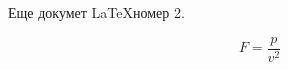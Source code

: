 \documentclass{article}
\begin{document}
Еще докумет \LaTeX номер 2.

$$ F=\frac{p} {v^2} $$
\end{document}

